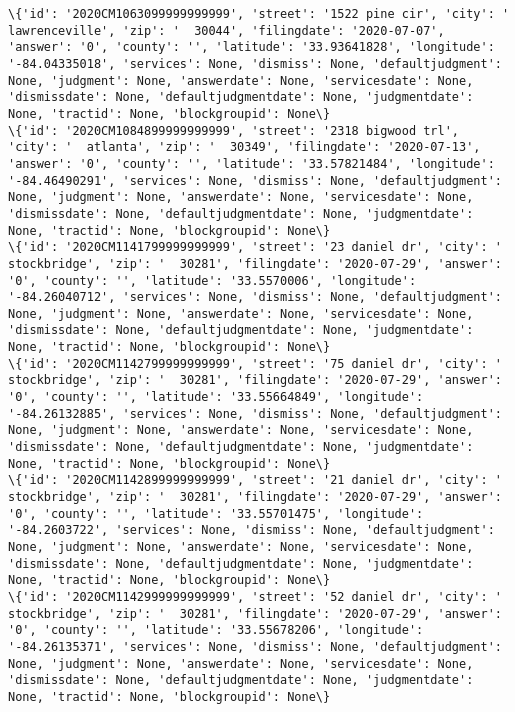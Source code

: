 \documentclass[11pt]{article}
\begin{document}
\begin{Verbatim}[commandchars=\\\{\}]
\{'id': '2020CM1063099999999999', 'street': '1522 pine cir', 'city': '  lawrenceville', 'zip': '  30044', 'filingdate': '2020-07-07', 'answer': '0', 'county': '', 'latitude': '33.93641828', 'longitude': '-84.04335018', 'services': None, 'dismiss': None, 'defaultjudgment': None, 'judgment': None, 'answerdate': None, 'servicesdate': None, 'dismissdate': None, 'defaultjudgmentdate': None, 'judgmentdate': None, 'tractid': None, 'blockgroupid': None\}
\{'id': '2020CM1084899999999999', 'street': '2318 bigwood trl', 'city': '  atlanta', 'zip': '  30349', 'filingdate': '2020-07-13', 'answer': '0', 'county': '', 'latitude': '33.57821484', 'longitude': '-84.46490291', 'services': None, 'dismiss': None, 'defaultjudgment': None, 'judgment': None, 'answerdate': None, 'servicesdate': None, 'dismissdate': None, 'defaultjudgmentdate': None, 'judgmentdate': None, 'tractid': None, 'blockgroupid': None\}
\{'id': '2020CM1141799999999999', 'street': '23 daniel dr', 'city': '  stockbridge', 'zip': '  30281', 'filingdate': '2020-07-29', 'answer': '0', 'county': '', 'latitude': '33.5570006', 'longitude': '-84.26040712', 'services': None, 'dismiss': None, 'defaultjudgment': None, 'judgment': None, 'answerdate': None, 'servicesdate': None, 'dismissdate': None, 'defaultjudgmentdate': None, 'judgmentdate': None, 'tractid': None, 'blockgroupid': None\}
\{'id': '2020CM1142799999999999', 'street': '75 daniel dr', 'city': '  stockbridge', 'zip': '  30281', 'filingdate': '2020-07-29', 'answer': '0', 'county': '', 'latitude': '33.55664849', 'longitude': '-84.26132885', 'services': None, 'dismiss': None, 'defaultjudgment': None, 'judgment': None, 'answerdate': None, 'servicesdate': None, 'dismissdate': None, 'defaultjudgmentdate': None, 'judgmentdate': None, 'tractid': None, 'blockgroupid': None\}
\{'id': '2020CM1142899999999999', 'street': '21 daniel dr', 'city': '  stockbridge', 'zip': '  30281', 'filingdate': '2020-07-29', 'answer': '0', 'county': '', 'latitude': '33.55701475', 'longitude': '-84.2603722', 'services': None, 'dismiss': None, 'defaultjudgment': None, 'judgment': None, 'answerdate': None, 'servicesdate': None, 'dismissdate': None, 'defaultjudgmentdate': None, 'judgmentdate': None, 'tractid': None, 'blockgroupid': None\}
\{'id': '2020CM1142999999999999', 'street': '52 daniel dr', 'city': '  stockbridge', 'zip': '  30281', 'filingdate': '2020-07-29', 'answer': '0', 'county': '', 'latitude': '33.55678206', 'longitude': '-84.26135371', 'services': None, 'dismiss': None, 'defaultjudgment': None, 'judgment': None, 'answerdate': None, 'servicesdate': None, 'dismissdate': None, 'defaultjudgmentdate': None, 'judgmentdate': None, 'tractid': None, 'blockgroupid': None\}

\end{Verbatim}
\end{document}
